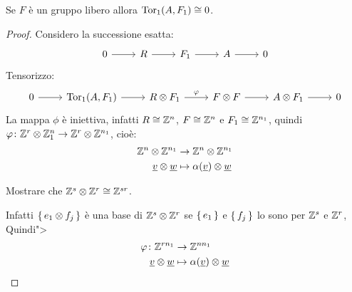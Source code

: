 \begin{lemma}
  Se $ F $ è un gruppo libero allora $ \mathrm{Tor_1}( A,F_1) \cong 0 $.
\end{lemma}
\begin{proof}
  Considero la successione esatta:
  \[
    \begin{tikzcd}
      0 \rar & R \rar & F_1 \rar & A \rar & 0
    \end{tikzcd}
  \]
  Tensorizzo:
  \[
    \begin{tikzcd}
      0 \rar & \tor{A,F_1} \rar & R \otimes F_1 \rar{\phi} & F \otimes F \rar & A \otimes F_1 \rar & 0
    \end{tikzcd}
  \]
  La mappa $ \phi $ è iniettiva, infatti $ R \cong \mathbb{Z}^n $, $ F \cong \mathbb{Z}^n $ e $ F_1 \cong \mathbb{Z}^{n_1} $,
  quindi $ \varphi \colon \mathbb{Z}^r \otimes \mathbb{Z}^n_1 \to \mathbb{Z}^r \otimes \mathbb{Z}^{n_1} $, cioè:
  \begin{align*}
    \mathbb{Z}^n \otimes \mathbb{Z}^{n_1} & \to  \mathbb{Z}^n \otimes \mathbb{Z}^{n_1} \\
    \underline{v} \otimes \underline{w} & \mapsto \alpha(\underline{v}) \otimes \underline{w}
  \end{align*}
  \begin{exercise}
    Mostrare che $ \mathbb{Z}^s \otimes \mathbb{Z}^r \cong \mathbb{Z}^{sr} $.
  \end{exercise}
  Infatti $ \set{e_1 \otimes f_j} $ è una base di $ \mathbb{Z}^s \otimes \mathbb{Z}^r $ se $ \set{e_1} $
  e $ \set{f_j} $ lo sono per $ \mathbb{Z}^s $ e $ \mathbb{Z}^r $,
  Quindi">
  \begin{align*}
    \varphi \colon \mathbb{Z}^{rn_1} & \to \mathbb{Z}^{n n_1} \\
    \underline{v} \otimes \underline{w} & \mapsto \alpha(\underline{v})\otimes \underline{w}
  \end{align*}
\end{proof}

